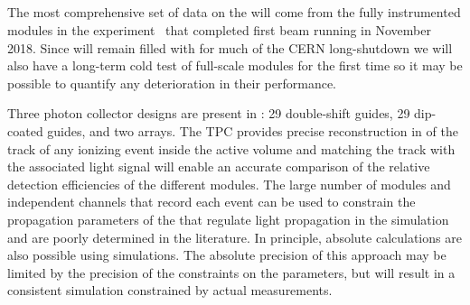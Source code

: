 \subsection{}

The most comprehensive set of data on the  will come from the fully instrumented modules in the  experiment~\cite{Abi:2017aow} that completed first beam running in November \num{2018}. 
Since  will remain filled with \lar for much of the CERN long-shutdown we will also have a long-term cold test of full-scale  modules for the first time so it may be possible to quantify any deterioration in their performance.


Three photon collector designs are present in : \num{29} double-shift guides, \num{29} dip-coated guides, and two  arrays. 
The TPC provides precise reconstruction in \threed of the track of any ionizing event inside the active volume and matching the track with the associated light signal will enable an accurate comparison of the relative detection efficiencies of the different  modules. 
The large number of modules and independent channels that record each event can be used to constrain the propagation parameters of the \lar that regulate  light propagation in the simulation and are poorly determined in the literature. %
In principle, absolute calculations are also possible using  simulations.
The absolute precision of this approach may be limited by the precision of the constraints on the parameters, but will result in a consistent simulation constrained by actual measurements. 


